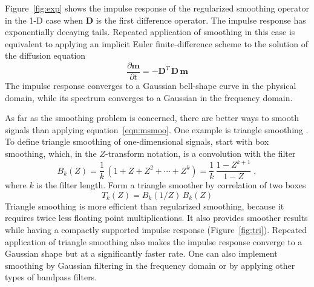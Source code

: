 Figure~\ref{fig:exp} shows the impulse response of the regularized
smoothing operator in the 1-D case when $\mathbf{D}$ is %
the first difference operator. The impulse response has exponentially
decaying tails. Repeated application of smoothing in this case is
equivalent to applying an implicit Euler finite-difference scheme to
the solution of the diffusion equation
\begin{equation}
  {\frac{\partial \mathbf{m}}{\partial t}} = 
  -\mathbf{D}^T\,\mathbf{D}\,\mathbf{m}
  \label{eq:diff}
\end{equation}
The impulse response converges to a Gaussian bell-shape curve in the physical
domain, while its spectrum converges to a Gaussian in the frequency domain.


As far as the smoothing problem is concerned, there are better ways to
smooth signals than applying
equation~\ref{eqn:msmoo}. One example is triangle
smoothing \cite[]{Claerbout.blackwell.92}. To define triangle
smoothing of one-dimensional signals, start with box smoothing, which,
in the $Z$-transform notation, is a convolution with the filter
\begin{equation}
  \label{eq:zbox}
  B_k(Z) = \frac{1}{k}\,\left(1 + Z + Z^2 + \cdots +  Z^k\right) = 
  \frac{1}{k}\,\frac{1-Z^{k+1}}{1-Z}\;,
\end{equation}
where $k$ is the filter length. Form a triangle smoother by
correlation of two boxes
\begin{equation}
  \label{eq:ztri}
  T_k(Z) = B_k(1/Z)\,B_k(Z) 
\end{equation}
Triangle smoothing is more
efficient than regularized smoothing, because it requires twice less
floating point multiplications. It also provides smoother results
while having a compactly supported impulse response
(Figure~\ref{fig:tri}). Repeated application of triangle smoothing
also makes the impulse response converge to a Gaussian shape but at a
significantly faster rate.
One can also implement smoothing by Gaussian filtering in the frequency domain
or by applying other types of bandpass filters. 


